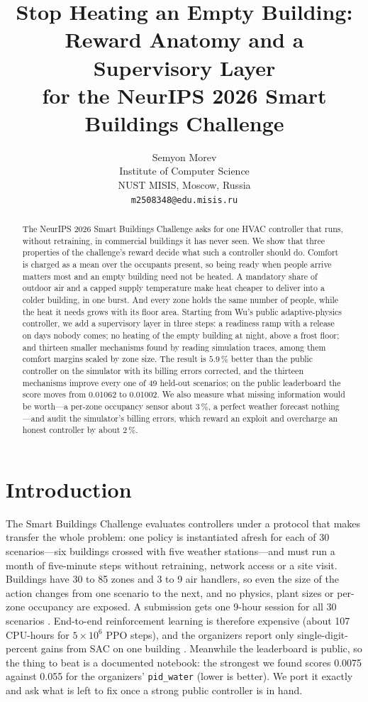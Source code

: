 \documentclass{article}
\title{Stop Heating an Empty Building: Reward Anatomy and a Supervisory Layer\\ for the NeurIPS 2026 Smart Buildings Challenge}
\author{%
  Semyon Morev\\
  Institute of Computer Science\\
  NUST MISIS, Moscow, Russia\\
  \texttt{m2508348@edu.misis.ru}
}
\newcommand{\cn}[1]{\texttt{#1}}
\begin{document}
\maketitle

\begin{abstract}
The NeurIPS 2026 Smart Buildings Challenge asks for one HVAC controller that runs, without
retraining, in commercial buildings it has never seen. We show that three properties of the
challenge's reward decide what such a controller should do. Comfort is charged as a mean over
the occupants present, so being ready when people arrive matters most and an empty building
need not be heated. A mandatory share of outdoor air and a capped supply temperature make heat
cheaper to deliver into a colder building, in one burst. And every zone holds the same number
of people, while the heat it needs grows with its floor area. Starting from Wu's public
adaptive-physics controller, we add a supervisory layer in three steps: a readiness ramp with a
release on days nobody comes; no heating of the empty building at night, above a frost floor;
and thirteen smaller mechanisms found by reading simulation traces, among them comfort margins
scaled by zone size. The result is $5.9\,\%$ better than the public controller on the simulator
with its billing errors corrected, and the thirteen mechanisms improve every one of 49 held-out
scenarios; on the public leaderboard the score moves from 0.01062 to 0.01002. We also measure
what missing information would be worth---a per-zone occupancy sensor about $3\,\%$, a perfect
weather forecast nothing---and audit the simulator's billing errors, which reward an exploit
and overcharge an honest controller by about $2\,\%$.
\end{abstract}

\section{Introduction}

The Smart Buildings Challenge \citep{goldfeder2026smart} evaluates controllers under a
protocol that makes transfer the whole problem: one policy is instantiated afresh for each
of 30 scenarios---six buildings crossed with five weather stations---and must run a month of
five-minute steps without retraining, network access or a site visit. Buildings have 30 to 85
zones and 3 to 9 air handlers, so even the size of the action changes from one scenario to the
next, and no physics, plant sizes or per-zone occupancy are exposed. A submission gets one
9-hour session for all 30 scenarios \citep{smartbuildings2026rules}. End-to-end reinforcement
learning is therefore expensive (about 107 CPU-hours for $5\times10^6$ PPO steps), and the
organizers report only single-digit-percent gains from SAC on one building
\citep{goldfeder2024smart}. Meanwhile the leaderboard is public, so the thing to beat is a
documented notebook: the strongest we found \citep{wu2026alpha075} scores 0.0075 against 0.055
for the organizers' \cn{pid\_water} (lower is better). We port it exactly and ask what is
left to fix once a strong public controller is in hand.
\end{document}
